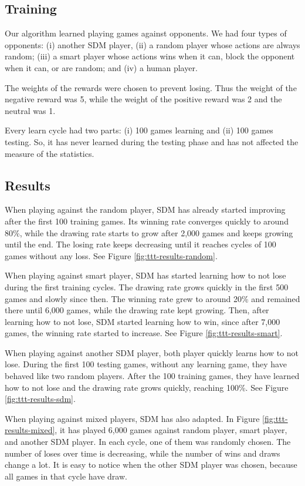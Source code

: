 \subsection{Training}

Our algorithm learned playing games against opponents. We had four types of opponents: (i) another SDM player, (ii) a random player whose actions are always random; (iii) a smart player whose actions wins when it can, block the opponent when it can, or are random; and (iv) a human player.

The weights of the rewards were chosen to prevent losing. Thus the weight of the negative reward was 5, while the weight of the positive reward was 2 and the neutral was 1.

Every learn cycle had two parts: (i) 100 games learning and (ii) 100 games testing. So, it has never learned during the testing phase and has not affected the measure of the statistics.


\subsection{Results}

When playing against the random player, SDM has already started improving after the first 100 training games. Its winning rate converges quickly to around 80\%, while the drawing rate starts to grow after 2,000 games and keeps growing until the end. The losing rate keeps decreasing until it reaches cycles of 100 games without any loss. See Figure \ref{fig:ttt-results-random}.

When playing against smart player, SDM has started learning how to not lose during the first training cycles. The drawing rate grows quickly in the first 500 games and slowly since then. The winning rate grew to around 20\% and remained there until 6,000 games, while the drawing rate kept growing. Then, after learning how to not lose, SDM started learning how to win, since after 7,000 games, the winning rate started to increase. See Figure \ref{fig:ttt-results-smart}.

When playing against another SDM player, both player quickly learns how to not lose. During the first 100 testing games, without any learning game, they have behaved like two random players. After the 100 training games, they have learned how to not lose and the drawing rate grows quickly, reaching 100\%. See Figure \ref{fig:ttt-results-sdm}.

When playing against mixed players, SDM has also adapted. In Figure \ref{fig:ttt-results-mixed}, it has played 6,000 games against random player, smart player, and another SDM player. In each cycle, one of them was randomly chosen. The number of loses over time is decreasing, while the number of wins and draws change a lot. It is easy to notice when the other SDM player was chosen, because all games in that cycle have draw.


